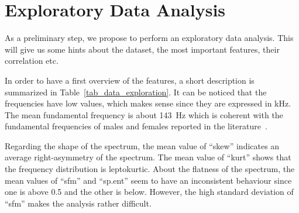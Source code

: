 \chapter{Exploratory Data Analysis}
\label{chapter_data_exploration}

As a preliminary step, we propose to perform an exploratory data analysis. This will give us some hints about the dataset, \eg{} the most important features, their correlation etc.

In order to have a first overview of the features, a short description is summarized in Table~\ref{tab_data_exploration}. It can be noticed that the frequencies have low values, which makes sense since they are expressed in \si{\kilo\hertz}. 
The mean fundamental frequency is about \SI{143}{\hertz} which is coherent with the fundamental frequencies of males and females reported in the literature~\cite{Traunmller1994}. 

Regarding the shape of the spectrum, the mean value of ``skew'' indicates an average right-asymmetry of the spectrum. The mean value of ``kurt'' shows that the frequency distribution is leptokurtic. About the flatness of the spectrum, the mean values of ``sfm'' and ``sp.ent'' seem to have an inconsistent behaviour since one is above \num{0.5} and the other is below. However, the high standard deviation of ``sfm'' makes the analysis rather difficult.

